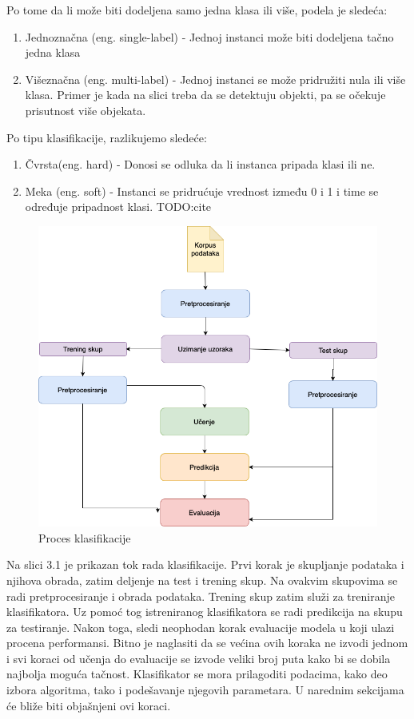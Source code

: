 \documentclass[12pt,oneside]{memoir}
\begin{document}
Po tome da li može biti dodeljena samo jedna klasa ili više, podela je sledeća:
\begin{enumerate}
\item Jednoznačna (eng. single-label) - Jednoj instanci može biti dodeljena tačno jedna klasa
\item Višeznačna (eng.  multi-label) - Jednoj instanci se može pridružiti nula ili više klasa.  Primer je kada na slici treba da se detektuju objekti,  pa se očekuje prisutnost više objekata. 
\end{enumerate}

Po tipu klasifikacije, razlikujemo sledeće:
\begin{enumerate}
\item Čvrsta(eng. hard) - Donosi se odluka da li instanca pripada klasi ili ne. 
\item Meka (eng. soft) - Instanci se pridrućuje vrednost između 0 i 1 i time se određuje pripadnost klasi.  TODO:cite
\end{enumerate}

\begin{figure}[h!]
\centering
\includegraphics[width=.7\textwidth]{images/workflow.png}
\caption{ Proces klasifikacije }
\label{Slika}
\end{figure}

Na slici 3.1 je prikazan tok rada klasifikacije.  Prvi korak je skupljanje podataka i njihova obrada,  zatim deljenje na test i trening skup.  Na ovakvim skupovima se radi pretprocesiranje i obrada podataka.  Trening skup zatim služi za treniranje klasifikatora.  Uz pomoć tog istreniranog klasifikatora se radi predikcija na skupu za testiranje.  Nakon toga, sledi neophodan korak evaluacije modela u koji ulazi procena performansi.  Bitno je naglasiti da se većina ovih koraka ne izvodi jednom i svi koraci od učenja do evaluacije se izvode veliki broj puta kako bi se dobila najbolja moguća tačnost.  Klasifikator se mora prilagoditi podacima,  kako deo izbora algoritma,  tako i podešavanje njegovih parametara. 
U narednim sekcijama će bliže biti objašnjeni ovi koraci.  
\end{document}
